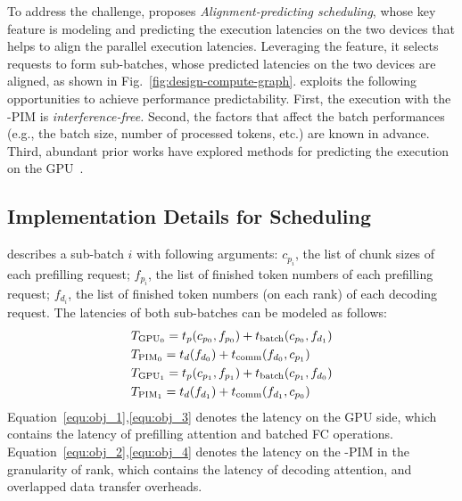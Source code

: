 To address the challenge, \sys proposes \emph{Alignment-predicting scheduling}, 
whose key feature is modeling and predicting the execution latencies on the two devices that helps to align the parallel execution latencies. 
Leveraging the feature, it selects requests to form sub-batches, whose predicted latencies on the two devices are aligned, as shown in Fig.~\ref{fig:design-compute-graph}.
\sys exploits the following opportunities to achieve performance predictability.
First, the execution with the \sys-PIM is \emph{interference-free.}  
Second, the factors that affect the batch performances (e.g., the batch size, number of processed tokens, etc.) are known in advance.
Third, abundant prior works have explored methods for predicting the execution on the GPU~\cite{cui2021abacus,gujarati2020clockwork,yang2022infless}.


\subsection{Implementation Details for Scheduling}
\sys describes a sub-batch $i$ with following arguments: 
$c_{p_{i}}$, the list of chunk sizes of each prefilling request;
$f_{p_{i}}$, the list of finished token numbers of each prefilling request;
$f_{d_{i}}$, the list of finished token numbers (on each rank) of each decoding request.
The latencies of both sub-batches can be modeled as follows: %
\begin{align}
  \label{equ:obj_1} &T_{{\rm GPU}_{0}} = t_{p}(c_{p_{0}}, f_{p_{0}}) + t_{\rm batch}(c_{p_{0}}, f_{d_{1}}) \\
  \label{equ:obj_2} &T_{{\rm PIM}_{0}} = t_{d}(f_{d_{0}}) + t_{\rm comm}(f_{d_{0}}, c_{p_{1}}) \\
  \label{equ:obj_3} &T_{{\rm GPU}_{1}} = t_{p}(c_{p_{1}}, f_{p_{1}}) + t_{\rm batch}(c_{p_{1}}, f_{d_{0}}) \\
  \label{equ:obj_4} &T_{{\rm PIM}_{1}} = t_{d}(f_{d_{1}}) + t_{\rm comm}(f_{d_{1}}, c_{p_{0}})
\end{align}
Equation~\ref{equ:obj_1},\ref{equ:obj_3} denotes the latency on the GPU side, which contains the latency of prefilling attention and batched FC operations.
Equation~\ref{equ:obj_2},\ref{equ:obj_4} denotes the latency on the \sys-PIM in the granularity of rank, which contains the latency of decoding attention, and overlapped data transfer overheads.

